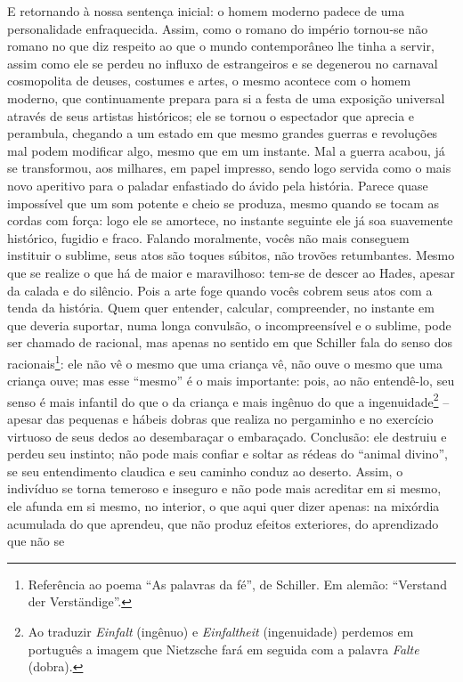 E retornando à nossa sentença inicial: o homem moderno padece de uma
personalidade enfraquecida. Assim, como o romano do império tornou-se
não romano no que diz respeito ao que o mundo contemporâneo lhe tinha a
servir, assim como ele se perdeu no influxo de estrangeiros e se
degenerou no carnaval cosmopolita de deuses, costumes e artes, o mesmo
acontece com o homem moderno, que continuamente prepara para si a festa
de uma exposição universal através de seus artistas históricos; ele se
tornou o espectador que aprecia e perambula, chegando a um estado em que
mesmo grandes guerras e revoluções mal podem modificar algo, mesmo que
em um instante. Mal a guerra acabou, já se transformou, aos milhares,
em papel impresso, sendo logo servida como o mais novo aperitivo para o
paladar enfastiado do ávido pela história. Parece quase impossível que
um som potente e cheio se produza, mesmo quando se tocam as cordas com
força: logo ele se amortece, no instante seguinte ele já soa suavemente
histórico, fugidio e fraco. Falando moralmente, vocês não mais conseguem
instituir o sublime, seus atos são toques súbitos, não trovões
retumbantes. Mesmo que se realize o que há de maior e maravilhoso:
tem-se de descer ao Hades, apesar da calada e do silêncio. Pois a arte
foge quando vocês cobrem seus atos com a tenda da história. Quem quer
entender, calcular, compreender, no instante em que deveria suportar,
numa longa convulsão, o incompreensível e o sublime, pode ser chamado de
racional, mas apenas no sentido em que Schiller fala do senso dos
racionais\footnote{Referência ao poema ``As palavras da fé'', de
  Schiller. Em alemão: ``Verstand der Verständige''.}: ele não vê o
mesmo que uma criança vê, não ouve o mesmo que uma criança ouve; mas
esse ``mesmo'' é o mais importante: pois, ao não entendê-lo, seu senso é
mais infantil do que o da criança e mais ingênuo do que a
ingenuidade\footnote{Ao traduzir \emph{Einfalt} (ingênuo) e
  \emph{Einfaltheit} (ingenuidade) perdemos em português a imagem que
  Nietz\-sche fará em seguida com a palavra \emph{Falte} (dobra).} --
apesar das pequenas e hábeis dobras que realiza no pergaminho e no
exercício virtuoso de seus dedos ao desembaraçar o embaraçado.
Conclusão: ele destruiu e perdeu seu instinto; não pode mais confiar e
soltar as rédeas do ``animal divino'', se seu entendimento claudica e
seu caminho conduz ao deserto. Assim, o indivíduo se torna temeroso e
inseguro e não pode mais acreditar em si mesmo, ele afunda em si mesmo,
no interior, o que aqui quer dizer apenas: na mixórdia acumulada do que
aprendeu, que não produz efeitos exteriores, do aprendizado que não se
